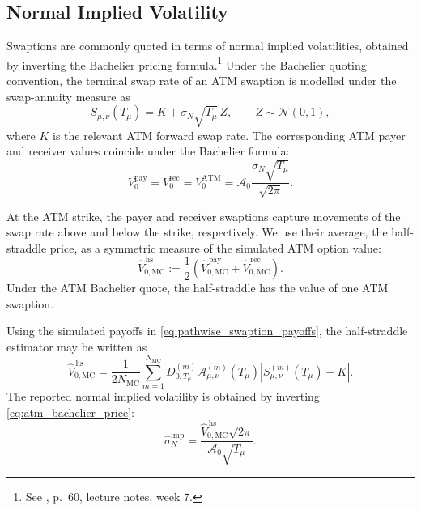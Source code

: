 \subsection{Normal Implied Volatility}
\label{subsec:normal_implied_volatility}

Swaptions are commonly quoted in terms of normal implied volatilities, obtained by inverting the Bachelier pricing formula.\footnote{See \citet{Skovmand2025tsm7}, p.~60, lecture notes, week 7.} Under the Bachelier quoting convention, the terminal swap rate of an ATM swaption is modelled under the swap-annuity measure as
\[
S_{\mu,\nu}(T_{\mu})
=
K+\sigma_N\sqrt{T_{\mu}}\,Z,
\qquad
Z\sim\mathcal N(0,1),
\]
where \(K\) is the relevant ATM forward swap rate. The corresponding ATM payer and receiver values coincide under the Bachelier formula:
\begin{equation}
V_0^{\mathrm{pay}}
=
V_0^{\mathrm{rec}}
=
V_0^{\mathrm{ATM}}
=
\mathcal A_0
\frac{\sigma_N\sqrt{T_{\mu}}}{\sqrt{2\pi}}.
\label{eq:atm_bachelier_price}
\end{equation}

At the ATM strike, the payer and receiver swaptions capture movements of the swap rate above and below the strike, respectively. We use their average, the half-straddle price, as a symmetric measure of the simulated ATM option value:
\begin{equation}
\widehat V_{0,\mathrm{MC}}^{\,\mathrm{hs}}
:=
\frac{1}{2}
\left(
\widehat V_{0,\mathrm{MC}}^{\,\mathrm{pay}}
+
\widehat V_{0,\mathrm{MC}}^{\,\mathrm{rec}}
\right).
\label{eq:half_straddle_price}
\end{equation}
Under the ATM Bachelier quote, the half-straddle has the value of one ATM swaption. 

Using the simulated payoffs in \eqref{eq:pathwise_swaption_payoffs}, the half-straddle estimator may be written as
\begin{equation}
\widehat V_{0,\mathrm{MC}}^{\,\mathrm{hs}}
=
\frac{1}{2N_{\mathrm{MC}}}
\sum_{m=1}^{N_{\mathrm{MC}}}
D_{0,T_{\mu}}^{(m)}
\mathcal A_{\mu,\nu}^{(m)}(T_{\mu})
\left|
S_{\mu,\nu}^{(m)}(T_{\mu})-K
\right|.
\label{eq:mc_half_straddle_price}
\end{equation}
The reported normal implied volatility is obtained by inverting \eqref{eq:atm_bachelier_price}:
\begin{equation}
\widehat{\sigma}_{N}^{\mathrm{imp}}
=
\frac{
\widehat V_{0,\mathrm{MC}}^{\,\mathrm{hs}}
\sqrt{2\pi}
}{
\mathcal A_0\sqrt{T_{\mu}}
}.
\label{eq:normal_implied_volatility}
\end{equation}

